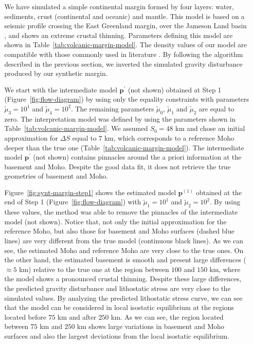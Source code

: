 \documentclass[manuscript,revised]{geophysics}
\begin{document}
We have simulated a simple continental margin formed by four layers: 
water, sediments, crust (continental and oceanic) and mantle.
This model is based on a seismic profile crossing the East Greenland margin,
over the Jameson Land basin \citep{peron-etal2013}, and shows an extreme crustal thinning.
Parameters defining this model are shown in Table~\ref{tab:volcanic-margin-model}.
The density values of our model are compatible with those commonly used in literature
\citep[e.g., ][]{gradmann-etal2017}.
By following the algorithm described in the previous section, we inverted the simulated 
gravity disturbance produced by our synthetic margin.

We start with the intermediate model $\mathbf{p}^{\prime}$ (not shown) 
obtained at Step 1 (Figure~\ref{fig:flow-diagram}) by using only the equality 
constraints with parameters $\tilde{\mu}_{3} = 10^{1}$ and $\tilde{\mu}_{4} = 10^{2}$.
The remaining parameters $\tilde{\mu}_{0}$, $\tilde{\mu}_{1}$ and
$\tilde{\mu}_{2}$ are equal to zero.
The interpretation model was defined by using the parameters shown in
Table~\ref{tab:volcanic-margin-model}.
We assumed $S_{0} = 48$ km and chose an initial approximation for $\Delta S$
equal to $7$ km, which corresponds to a reference Moho deeper 
than the true one (Table~\ref{tab:volcanic-margin-model}).
The intermediate model $\mathbf{p}^{\prime}$ (not shown) contains pinnacles around 
the a priori information at the basement and Moho.
Despite the good data fit, it does not retrieve the true geometries 
of basement and Moho.

Figure~\ref{fig:synt-margin-step1} shows the estimated model $\mathbf{p}^{(1)}$ 
obtained at the end of Step 1 (Figure~\ref{fig:flow-diagram}) with
$\tilde{\mu}_{1} = 10^{1}$ and $\tilde{\mu}_{2} = 10^{2}$.
By using these values, the method was able to remove the pinnacles of 
the intermediate model (not shown).
Notice that, not only the initial approximation for the reference Moho,
but also those for basement and Moho surfaces (dashed blue lines) are very different from
the true model (continuous black lines).
As we can see, the estimated Moho and reference Moho are very close to the true ones.
On the other hand, the estimated basement is smooth and present large differences
($\approx 5$ km) relative to the true one at the region between $100$ and $150$ km,
where the model shows a pronounced crustal thinning.
Despite these large differences, 
the predicted gravity disturbance and lithostatic stress 
are very close to the simulated values.
By analyzing the predicted lithostatic stress curve, we can see that the model
can be considered in local isostatic equilibrium at the regions located before 
$75$ km and after $250$ km. As we can see, the region located
between $75$ km and $250$ km shows large variations in basement and Moho 
surfaces and also the largest deviations from the local isostatic equilibrium.
\end{document}
